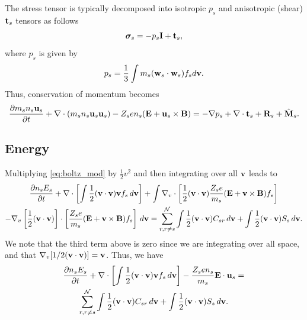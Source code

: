 \documentclass[a4paper,11pt]{report}
\begin{document}
The stress tensor is typically decomposed into isotropic $p_s$ and anisotropic (shear) $\mathbf{t}_s$ tensors as follows
\begin{equation}
\boldsymbol{\sigma}_s = - p_s \mathbf{I} + \mathbf{t}_s,
\end{equation}
where $p_s$ is given by
\begin{equation}
p_s = \frac{1}{3} \int m_s (\mathbf{w}_s \cdot \mathbf{w}_s) f_s d\mathbf{v}.
\end{equation}
Thus, conservation of momentum becomes
\begin{equation}
\label{eq:mom_derv_6}
\frac{\partial m_s n_s \mathbf{u}_s}{\partial t} + \nabla \cdot \left ( m_s n_s \mathbf{u}_s \mathbf{u}_s \right) - Z_s e n_s ( \mathbf{E} + \mathbf{u}_s \times \mathbf{B} ) = - \nabla p_s + \nabla \cdot \mathbf{t}_s + \mathbf{R}_s + \hat{\mathbf{M}}_s.
\end{equation}

\subsection{Energy}
Multiplying \cref{eq:boltz_mod} by $\frac{1}{2} v^2$ and then integrating over all $\mathbf{v}$ leads to
\begin{multline}
\label{eq:energy_derv_1}
\frac{\partial n_s E_s}{\partial t} + \nabla \cdot \left [ \int \frac{1}{2} (\mathbf{v} \cdot \mathbf{v}) \mathbf{v} f_s \, d\mathbf{v} \right ] + \int \nabla_v \cdot \left [ \frac{1}{2} (\mathbf{v} \cdot \mathbf{v}) \frac{Z_s e}{m_s} ( \mathbf{E} + \mathbf{v} \times \mathbf{B} ) f_s \right ] \\
- \nabla_v \left [ \frac{1}{2} (\mathbf{v} \cdot \mathbf{v}) \right ] \cdot \left [ \frac{Z_s e}{m_s} ( \mathbf{E} + \mathbf{v} \times \mathbf{B} ) f_s \right ] \, d\mathbf{v} = \sum_{r, r \ne s}^\mathcal{N} \int \frac{1}{2} (\mathbf{v} \cdot \mathbf{v}) C_{s r} \, d\mathbf{v} + \int \frac{1}{2} (\mathbf{v} \cdot \mathbf{v}) S_s \, d\mathbf{v}.
\end{multline}
We note that the third term above is zero since we are integrating over all space, and that $\nabla_v [ 1/2 (\mathbf{v} \cdot \mathbf{v} ) ] = \mathbf{v}$. Thus, we have
\begin{multline}
\label{eq:energy_derv_2}
\frac{\partial n_s E_s}{\partial t} + \nabla \cdot \left [ \int \frac{1}{2} (\mathbf{v} \cdot \mathbf{v}) \mathbf{v} f_s \, d\mathbf{v} \right ] - \frac{Z_s e n_s}{m_s} \mathbf{E} \cdot \mathbf{u}_s =\\
\sum_{r, r \ne s}^\mathcal{N} \int \frac{1}{2} (\mathbf{v} \cdot \mathbf{v}) C_{s r} \, d\mathbf{v} + \int \frac{1}{2} (\mathbf{v} \cdot \mathbf{v}) S_s \, d\mathbf{v}.
\end{multline}
\end{document}
